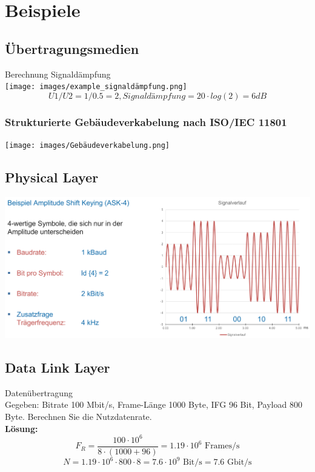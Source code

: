 \section{Beispiele}

\subsection*{Übertragungsmedien}

\begin{example2}{Berechnung Signaldämpfung}\\
    \texttt{[image: images/example\_signaldämpfung.png]}
    $$U1/U2 = 1/0.5 = 2, Signaldämpfung = 20 \cdot log(2) = 6dB$$
\end{example2}

\subsubsection{Strukturierte Gebäudeverkabelung nach ISO/IEC 11801}
        \centering
        \texttt{[image: images/Gebäudeverkabelung.png]}

\subsection*{Physical Layer}

\begin{example}
    \includegraphics[width=1\linewidth]{images/amplitude_shift_keying.png}
\end{example}



\subsection*{Data Link Layer}

\begin{example2}{Datenübertragung}\\
    Gegeben: Bitrate 100 Mbit/s, Frame-Länge 1000 Byte, IFG 96 Bit, Payload 800 Byte. Berechnen Sie die Nutzdatenrate.\\
    \textbf{Lösung:}\\
    $$F_R = \frac{100 \cdot 10^6}{8 \cdot (1000 + 96)} = 1.19 \cdot 10^6 \text{ Frames/s}$$
    $$N = 1.19 \cdot 10^6 \cdot 800 \cdot 8 = 7.6 \cdot 10^9 \text{ Bit/s} = 7.6 \text{ Gbit/s}$$
\end{example2}

